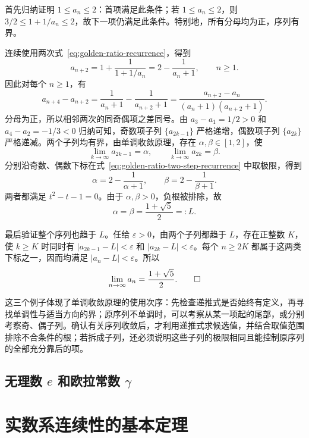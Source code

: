 \documentclass[UTF8,12pt,a4paper,fontset=fandol]{ctexbook}
\begin{document}
\begin{solve}
首先归纳证明 $1\leq a_n\leq2$：首项满足此条件；若 $1\leq a_n\leq2$，则 $3/2\leq1+1/a_n\leq2$，故下一项仍满足此条件。特别地，所有分母均为正，序列有界。

连续使用两次式~\eqref{eq:golden-ratio-recurrence}，得到
\begin{equation}
    a_{n+2}=1+\frac1{1+1/a_n}
    =2-\frac1{a_n+1},\qquad n\geq1.
    \label{eq:golden-ratio-two-step-recurrence}
\end{equation}
因此对每个 $n\geq1$，有
\[
    a_{n+4}-a_{n+2}
    =\frac1{a_n+1}-\frac1{a_{n+2}+1}
    =\frac{a_{n+2}-a_n}{(a_n+1)(a_{n+2}+1)}.
\]
分母为正，所以相邻两次的同奇偶项之差同号。由 $a_3-a_1=1/2>0$ 和 $a_4-a_2=-1/3<0$ 归纳可知，奇数项子列 $\{a_{2k-1}\}$ 严格递增，偶数项子列 $\{a_{2k}\}$ 严格递减。两个子列均有界，由单调收敛原理，存在 $\alpha,\beta\in[1,2]$，使
\[
    \lim_{k\to\infty}a_{2k-1}=\alpha,\qquad
    \lim_{k\to\infty}a_{2k}=\beta.
\]
分别沿奇数、偶数下标在式~\eqref{eq:golden-ratio-two-step-recurrence} 中取极限，得到
\[
    \alpha=2-\frac1{\alpha+1},\qquad
    \beta=2-\frac1{\beta+1}.
\]
两者都满足 $t^2-t-1=0$。由于 $\alpha,\beta>0$，负根被排除，故
\[
    \alpha=\beta=\frac{1+\sqrt5}{2}=:L.
\]

最后验证整个序列也趋于 $L$。任给 $\varepsilon>0$，由两个子列都趋于 $L$，存在正整数 $K$，使 $k\geq K$ 时同时有 $|a_{2k-1}-L|<\varepsilon$ 和 $|a_{2k}-L|<\varepsilon$。每个 $n\geq2K$ 都属于这两类下标之一，因而均满足 $|a_n-L|<\varepsilon$。所以
\[
    \lim_{n\to\infty}a_n=\frac{1+\sqrt5}{2}.\qedhere
\]
\end{solve}

这三个例子体现了单调收敛原理的使用次序：先检查递推式是否始终有定义，再寻找单调性与适当方向的界；原序列不单调时，可以考察从某一项起的尾部，或分别考察奇、偶子列。确认有关序列收敛后，才利用递推式求候选值，并结合取值范围排除不合条件的根；若拆成子列，还必须说明这些子列的极限相同且能控制原序列的全部充分靠后的项。

\subsection{无理数 \texorpdfstring{$e$}{e} 和欧拉常数 \texorpdfstring{$\gamma$}{gamma}}
\label{subsec:e-and-euler-constant}

\section{实数系连续性的基本定理}
\label{sec:fundamental-theorems-of-real-continuity}
\end{document}
